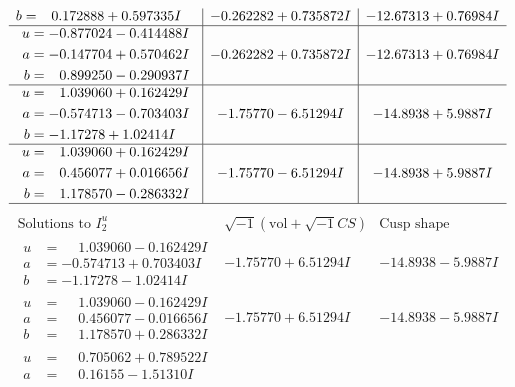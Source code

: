 \documentclass[1p]{elsarticle_modified}
\theoremstyle{definition}
\newcommand{\I}{\sqrt{-1}}
\begin{document}
$$\begin{array}{c|c|c}
\begin{aligned}
b &= \phantom{-}0.172888 + 0.597335 I\end{aligned}
 & -0.262282 + 0.735872 I & -12.67313 + 0.76984 I \\ \hline\begin{aligned}
u &= -0.877024 - 0.414488 I \\
a &= -0.147704 + 0.570462 I \\
b &= \phantom{-}0.899250 - 0.290937 I\end{aligned}
 & -0.262282 + 0.735872 I & -12.67313 + 0.76984 I \\ \hline\begin{aligned}
u &= \phantom{-}1.039060 + 0.162429 I \\
a &= -0.574713 - 0.703403 I \\
b &= -1.17278 + 1.02414 I\end{aligned}
 & -1.75770 - 6.51294 I & -14.8938 + 5.9887 I \\ \hline\begin{aligned}
u &= \phantom{-}1.039060 + 0.162429 I \\
a &= \phantom{-}0.456077 + 0.016656 I \\
b &= \phantom{-}1.178570 - 0.286332 I\end{aligned}
 & -1.75770 - 6.51294 I & -14.8938 + 5.9887 I\\
 \hline 
 \end{array}$$\newpage$$\begin{array}{c|c|c}  
\text{Solutions to }I^u_{2}& \I (\text{vol} + \sqrt{-1}CS) & \text{Cusp shape}\\
 \hline 
\begin{aligned}
u &= \phantom{-}1.039060 - 0.162429 I \\
a &= -0.574713 + 0.703403 I \\
b &= -1.17278 - 1.02414 I\end{aligned}
 & -1.75770 + 6.51294 I & -14.8938 - 5.9887 I \\ \hline\begin{aligned}
u &= \phantom{-}1.039060 - 0.162429 I \\
a &= \phantom{-}0.456077 - 0.016656 I \\
b &= \phantom{-}1.178570 + 0.286332 I\end{aligned}
 & -1.75770 + 6.51294 I & -14.8938 - 5.9887 I \\ \hline\begin{aligned}
u &= \phantom{-}0.705062 + 0.789522 I \\
a &= \phantom{-}0.16155 - 1.51310 I \\

\end{aligned}
\end{array}$$
\end{document}
